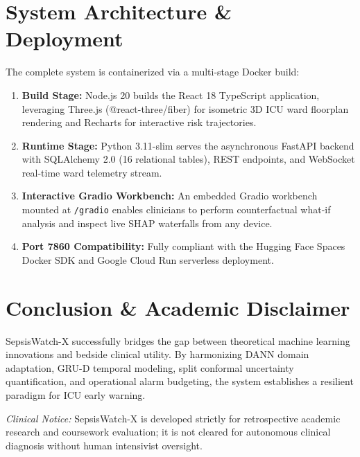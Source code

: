 \documentclass[conference]{IEEEtran}
\begin{document}
\section{System Architecture \& Deployment}
The complete system is containerized via a multi-stage Docker build:
\begin{enumerate}
    \item \textbf{Build Stage:} Node.js 20 builds the React 18 TypeScript application, leveraging Three.js (@react-three/fiber) for isometric 3D ICU ward floorplan rendering and Recharts for interactive risk trajectories.
    \item \textbf{Runtime Stage:} Python 3.11-slim serves the asynchronous FastAPI backend with SQLAlchemy 2.0 (16 relational tables), REST endpoints, and WebSocket real-time ward telemetry stream.
    \item \textbf{Interactive Gradio Workbench:} An embedded Gradio workbench mounted at \texttt{/gradio} enables clinicians to perform counterfactual what-if analysis and inspect live SHAP waterfalls from any device.
    \item \textbf{Port 7860 Compatibility:} Fully compliant with the Hugging Face Spaces Docker SDK and Google Cloud Run serverless deployment.
\end{enumerate}

\section{Conclusion \& Academic Disclaimer}
SepsisWatch-X successfully bridges the gap between theoretical machine learning innovations and bedside clinical utility. By harmonizing DANN domain adaptation, GRU-D temporal modeling, split conformal uncertainty quantification, and operational alarm budgeting, the system establishes a resilient paradigm for ICU early warning. 

\textit{Clinical Notice:} SepsisWatch-X is developed strictly for retrospective academic research and coursework evaluation; it is not cleared for autonomous clinical diagnosis without human intensivist oversight.
\end{document}
